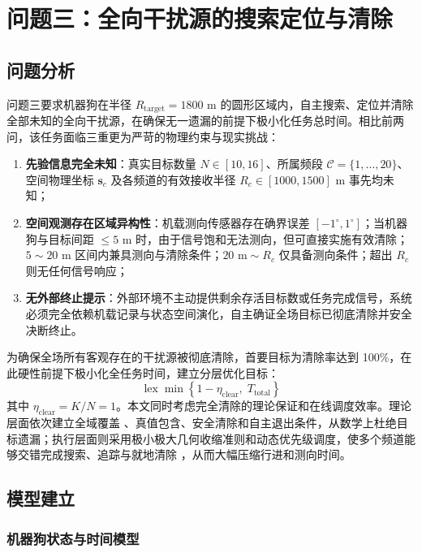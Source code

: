 \documentclass[zihao=-4,a4paper,UTF8]{ctexart}
\begin{document}
\section{问题三：全向干扰源的搜索定位与清除}

\subsection{问题分析}

问题三要求机器狗在半径 $R_{\mathrm{target}} = 1800\text{ m}$ 的圆形区域内，自主搜索、定位并清除全部未知的全向干扰源，在确保无一遗漏的前提下极小化任务总时间。相比前两问，该任务面临三重更为严苛的物理约束与现实挑战：
\begin{enumerate}[leftmargin=2.5em, itemsep=0.15em]
    \item \textbf{先验信息完全未知}：真实目标数量 $N \in [10, 16]$、所属频段 $\mathcal{C} = \{1, \dots, 20\}$、空间物理坐标 $\mathbf{s}_c$ 及各频道的有效接收半径 $R_c \in [1000, 1500]\text{ m}$ 事先均未知；
    \item \textbf{空间观测存在区域异构性}：机载测向传感器存在确界误差 $[-1^\circ, 1^\circ]$；当机器狗与目标间距 $\le 5\text{ m}$ 时，由于信号饱和无法测向，但可直接实施有效清除；$5\sim 20\text{ m}$ 区间内兼具测向与清除条件；$20\text{ m}\sim R_c$ 仅具备测向条件；超出 $R_c$ 则无任何信号响应；
    \item \textbf{无外部终止提示}：外部环境不主动提供剩余存活目标数或任务完成信号，系统必须完全依赖机载记录与状态空间演化，自主确证全场目标已彻底清除并安全决断终止。
\end{enumerate}

为确保全场所有客观存在的干扰源被彻底清除，首要目标为清除率达到 100\%，在此硬性前提下极小化全任务时间，建立分层优化目标：
\begin{equation}
    \operatorname{lex}\min \left\{ 1 - \eta_{\mathrm{clear}},\; T_{\mathrm{total}} \right\}
\end{equation}
其中 $\eta_{\mathrm{clear}} = K/N = 1$。本文同时考虑完全清除的理论保证和在线调度效率。理论层面依次建立全域覆盖 \cite{choset2001}、真值包含、安全清除和自主退出条件，从数学上杜绝目标遗漏；执行层面则采用极小极大几何收缩准则和动态优先级调度，使多个频道能够交错完成搜索、追踪与就地清除 \cite{song2012}，从而大幅压缩行进和测向时间。

\subsection{模型建立}

\subsubsection{机器狗状态与时间模型}
\end{document}
